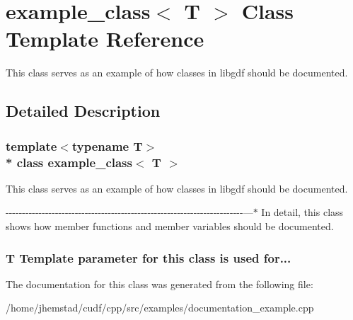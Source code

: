 \hypertarget{classexample__class}{}\section{example\+\_\+class$<$ T $>$ Class Template Reference}
\label{classexample__class}


This class serves as an example of how classes in libgdf should be documented.  




\subsection{Detailed Description}
\subsubsection*{template$<$typename T$>$\\*
class example\+\_\+class$<$ T $>$}

This class serves as an example of how classes in libgdf should be documented. 

-\/-\/-\/-\/-\/-\/-\/-\/-\/-\/-\/-\/-\/-\/-\/-\/-\/-\/-\/-\/-\/-\/-\/-\/-\/-\/-\/-\/-\/-\/-\/-\/-\/-\/-\/-\/-\/-\/-\/-\/-\/-\/-\/-\/-\/-\/-\/-\/-\/-\/-\/-\/-\/-\/-\/-\/-\/-\/-\/-\/-\/-\/-\/-\/-\/-\/-\/-\/-\/-\/-\/-\/---$\ast$ In detail, this class shows how member functions and member variables should be documented.

\subsubsection*{T Template parameter for this class is used for... }

The documentation for this class was generated from the following file\+:\begin{DoxyCompactItemize}
\item 
/home/jhemstad/cudf/cpp/src/examples/documentation\+\_\+example.\+cpp\end{DoxyCompactItemize}
